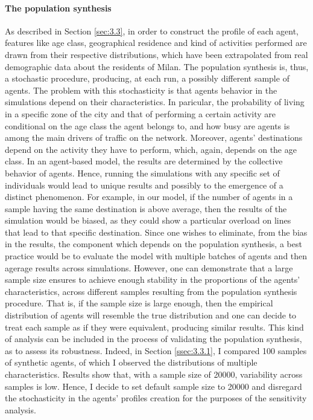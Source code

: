 \paragraph{The population synthesis} 
As described in Section \ref{sec:3.3}, in order to construct the profile of each agent, features like age class, geographical residence and kind of activities performed are drawn from their respective distributions, which have been extrapolated from real demographic data about the residents of Milan. The population synthesis is, thus, a stochastic procedure, producing, at each run, a possibly different sample of agents. The problem with this stochasticity is that agents behavior in the simulations depend on their characteristics. In paricular, the probability of living in a specific zone of the city and that of performing a certain activity are conditional on the age class the agent belongs to, and how busy are agents is among the main drivers of traffic on the network. Moreover, agents' destinations depend on the activity they have to perform, which, again, depends on the age class. In an agent-based model, the results are determined by the collective behavior of agents. Hence, running the simulations with any specific set of individuals would lead to unique results and possibly to the emergence of a distinct phenomenon. For example, in our model, if the number of agents in a sample having the same destination is above average, then the results of the simulation would be biased, as they could show a particular overload on lines that lead to that specific destination. Since one wishes to eliminate, from the bias in the results, the component which depends on the population synthesis, a best practice would be to evaluate the model with multiple batches of agents and then agerage results across simulations. However, one can demonstrate that a large sample size ensures to achieve enough stability in the proportions of the agents' characteristics, across different samples resulting from the population synthesis procedure. That is, if the sample size is large enough, then the empirical distribution of agents will resemble the true distribution and one can decide to treat each sample as if they were equivalent, producing similar results. This kind of analysis can be included in the process of validating the population synthesis, as to assess its robustness. Indeed, in Section \ref{ssec:3.3.1}, I compared 100 samples of synthetic agents, of which I observed the distributions of multiple characteristics. Results show that, with a sample size of 20000, variability across samples is low. Hence, I decide to set default sample size to 20000 and disregard the stochasticity in the agents' profiles creation for the purposes of the sensitivity analysis.


